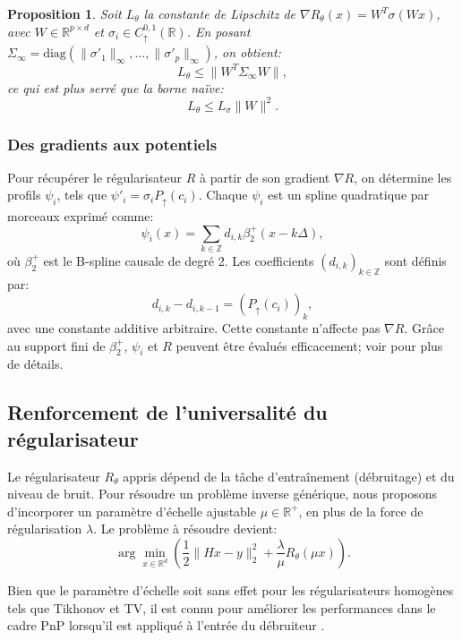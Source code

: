 \documentclass[a4paper, 12pt]{report} %
\newtheorem{proposition}{Proposition}[section]
\begin{document}
\begin{proposition}
Soit \( L_\theta \) la constante de Lipschitz de \( \nabla R_\theta(x) = W^T \sigma(Wx) \), avec \( W \in \mathbb{R}^{p \times d} \) et \( \sigma_i \in C^{0,1}_{\uparrow}(\mathbb{R}) \). En posant \( \Sigma_\infty = \text{diag}(\|\sigma'_1\|_\infty, \ldots, \|\sigma'_p\|_\infty) \), on obtient:
\[
L_\theta \leq \|W^T \Sigma_\infty W\|,
\]
ce qui est plus serré que la borne naïve:
\[
L_\theta \leq L_\sigma \|W\|^2.
\]
\end{proposition}

\subsubsection{Des gradients aux potentiels}

Pour récupérer le régularisateur \( R \) à partir de son gradient \( \nabla R \), on détermine les profils \( \psi_i \), tels que \( \psi'_i = \sigma_i P_{\uparrow}(c_i) \). Chaque \( \psi_i \) est un spline quadratique par morceaux exprimé comme:
\[
\psi_i(x) = \sum_{k \in \mathbb{Z}} d_{i,k} \beta_2^+ \left( x - k \Delta \right),
\]
où \( \beta_2^+ \) est le B-spline causale de degré 2. Les coefficients \( (d_{i,k})_{k \in \mathbb{Z}} \) sont définis par:
\[
d_{i,k} - d_{i,k-1} = (P_{\uparrow}(c_i))_k,
\]
avec une constante additive arbitraire. Cette constante n’affecte pas \( \nabla R \). Grâce au support fini de \( \beta_2^+ \), \( \psi_i \) et \( R \) peuvent être évalués efficacement; voir \cite{unser1999splines} pour plus de détails.

\subsection{Renforcement de l'universalité du régularisateur}

Le régularisateur \( R_\theta \) appris dépend de la tâche d'entraînement (débruitage) et du niveau de bruit. Pour résoudre un problème inverse générique, nous proposons d'incorporer un paramètre d'échelle ajustable \( \mu \in \mathbb{R}^+ \), en plus de la force de régularisation \( \lambda \). Le problème à résoudre devient:
\[
\arg \min_{x \in \mathbb{R}^d} \left( \frac{1}{2} \|Hx - y\|_2^2 + \frac{\lambda}{\mu} R_\theta(\mu x) \right).
\]

Bien que le paramètre d'échelle soit sans effet pour les régularisateurs homogènes tels que Tikhonov et TV, il est connu pour améliorer les performances dans le cadre PnP lorsqu'il est appliqué à l'entrée du débruiteur \cite{xu2020boosting}. 
\end{document}
